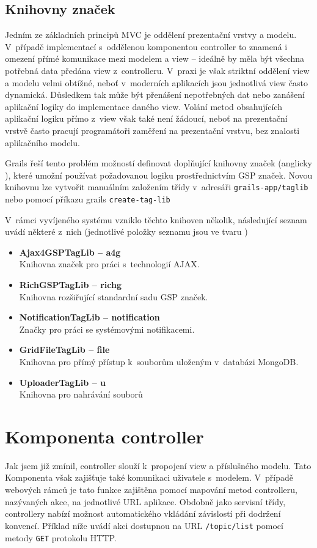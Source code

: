 \subsection{Knihovny značek}
Jedním ze základních principů MVC je oddělení prezentační vrstvy a modelu. V~případě implementací s~oddělenou komponentou controller to znamená i omezení přímé komunikace mezi modelem a view  -- ideálně by měla být všechna potřebná data předána view z~controlleru. V~praxi je však striktní oddělení view a modelu velmi obtížné, neboť v~moderních aplikacích jsou jednotlivá view často dynamická. Důsledkem tak může být přenášení nepotřebných dat nebo zanášení aplikační logiky do implementace daného view. Volání metod obsahujících aplikační logiku přímo z~view však také není žádoucí, neboť na prezentační vrstvě často pracují programátoři zaměření na prezentační vrstvu, bez znalosti aplikačního modelu.


Grails řeší tento problém možností definovat doplňující knihovny značek (anglicky ), které umožní používat požadovanou logiku prostřednictvím GSP značek. Novou knihovnu lze vytvořit manuálním založením třídy v~adresáři \texttt{grails-app/taglib} nebo pomocí příkazu grails \texttt{create-tag-lib}

V~rámci vyvíjeného systému vzniklo těchto knihoven několik, následující seznam uvádí některé z~nich (jednotlivé položky seznamu jsou ve tvaru )
\begin{itemize}
\item \textbf{Ajax4GSPTagLib -- a4g} \\
Knihovna značek pro práci s~technologií AJAX.
\item \textbf{RichGSPTagLib -- richg}\\
Knihovna rozšiřující standardní sadu GSP značek.
\item \textbf{NotificationTagLib -- notification}\\
Značky pro práci se systémovými notifikacemi.
\item \textbf{GridFileTagLib -- file}\\
Knihovna pro přímý přístup k~souborům uloženým v~databázi MongoDB.
\item \textbf{UploaderTagLib -- u}\\
Knihovna pro nahrávání souborů
\end{itemize}

\section{Komponenta controller }
Jak jsem již zmínil, controller slouží k~propojení view a příslušného modelu. Tato Komponenta však zajišťuje také komunikaci uživatele s~modelem. V~případě webových rámců je tato funkce zajištěna pomocí mapování metod controlleru, nazývaných akce, na jednotlivé URL aplikace. Obdobně jako servisní třídy, controllery nabízí možnost automatického vkládání závislostí při dodržení konvencí. Příklad níže uvádí akci dostupnou na URL \texttt{/topic/list} pomocí metody \texttt{GET} protokolu HTTP.

